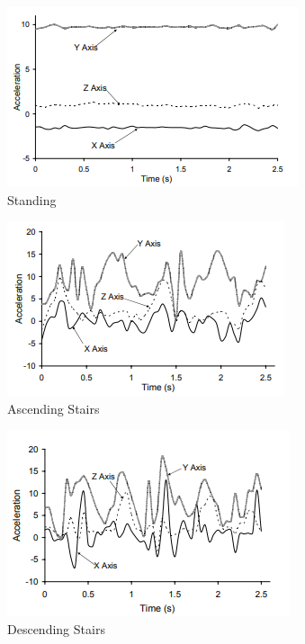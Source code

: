 \documentclass[conference]{IEEEtran}
\begin{document}
\begin{figure}[!htb]
  \includegraphics[width=\linewidth]{standing.png}
  \caption{Standing}
  \label{fig:standing}
\end{figure}
\begin{figure}[!htb]
  \includegraphics[width=\linewidth]{ascending_stairs.png}
  \caption{Ascending Stairs}
  \label{fig:ascendingStairs}
\end{figure}
\begin{figure}[!htb]
  \includegraphics[width=\linewidth]{descending_stairs.png}
  \caption{Descending Stairs}
  \label{fig:descendingStairs}
\end{figure}
\end{document}
